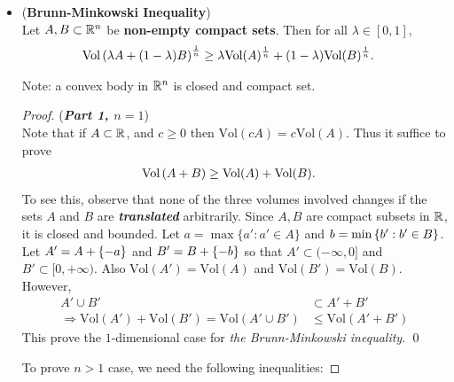 \documentclass[11pt]{article}
\begin{document}
\begin{itemize}
\item \begin{theorem} (\textbf{Brunn-Minkowski Inequality}) \citep{boucheron2013concentration, vershynin2018high, wainwright2019high}\\
Let $A, B \subset {\mathbb R}^n$ be \textbf{non-empty compact sets}. Then for all $\lambda \in [0, 1]$,
\begin{align}
\text{Vol}\left( \lambda A + (1- \lambda) B \right)^{\frac{1}{n}} &\ge \lambda\text{Vol}(A)^{\frac{1}{n}} + (1- \lambda)\text{Vol}(B)^{\frac{1}{n}}.   \label{ineqn: brunn_minkowski_inequality}
\end{align}
\end{theorem}
Note:  a convex body in ${\mathbb R}^n$ is closed and compact set.
\begin{proof} (\textbf{\emph{Part 1, $n = 1$}})\\
Note that if $A \subset {\mathbb R}$, and $c \ge 0$ then $\text{Vol}(cA) = c\text{Vol}(A)$. Thus it suffice to prove
\begin{align*}
\text{Vol}\left(  A + B \right) &\ge \text{Vol}(A) + \text{Vol}(B).
\end{align*} To see this, observe that none of the three volumes involved changes if the sets $A$ and $B$ are \emph{\textbf{translated}} arbitrarily. Since $A, B$ are compact subsets in ${\mathbb R}$, it is closed and bounded. Let $a = \max\{a': a' \in A\}$ and $b = \min\left\{b': b' \in B\right\}$. Let $A' = A +\left\{-a\right\}$ and $B' = B + \left\{-b\right\}$ so that $A' \subset (-\infty, 0]$ and $B' \subset [0, +\infty)$. Also $\text{Vol}(A') = \text{Vol}(A)$ and $\text{Vol}(B') = \text{Vol}(B)$. 
However, 
\begin{align*}
A' \cup B' &\subset A' + B' \\
\Rightarrow \text{Vol}(A') + \text{Vol}(B') = \text{Vol}(A' \cup B' ) &\le \text{Vol}(A' + B')
\end{align*} This prove the $1$-dimensional case for \emph{the Brunn-Minkowski inequality}. \qed

To prove $n > 1$ case, we need the following inequalities: 
\end{proof}


\end{itemize}
\end{document}

